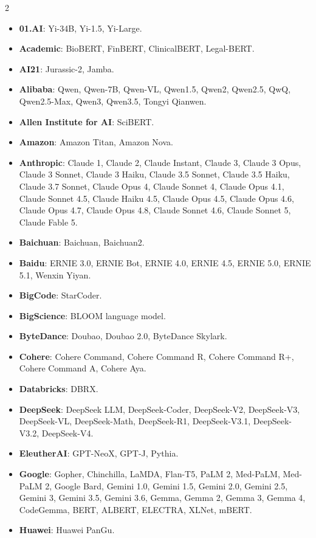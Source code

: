 \documentclass[11pt]{article}
\begin{document}
\begin{multicols}{2}
\begin{itemize} \small \setlength\itemsep{-0.4em}
  \item \textbf{01.AI}: Yi-34B, Yi-1.5, Yi-Large.
  \item \textbf{Academic}: BioBERT, FinBERT, ClinicalBERT, Legal-BERT.
  \item \textbf{AI21}: Jurassic-2, Jamba.
  \item \textbf{Alibaba}: Qwen, Qwen-7B, Qwen-VL, Qwen1.5, Qwen2, Qwen2.5, QwQ, Qwen2.5-Max, Qwen3, Qwen3.5, Tongyi Qianwen.
  \item \textbf{Allen Institute for AI}: SciBERT.
  \item \textbf{Amazon}: Amazon Titan, Amazon Nova.
  \item \textbf{Anthropic}: Claude 1, Claude 2, Claude Instant, Claude 3, Claude 3 Opus, Claude 3 Sonnet, Claude 3 Haiku, Claude 3.5 Sonnet, Claude 3.5 Haiku, Claude 3.7 Sonnet, Claude Opus 4, Claude Sonnet 4, Claude Opus 4.1, Claude Sonnet 4.5, Claude Haiku 4.5, Claude Opus 4.5, Claude Opus 4.6, Claude Opus 4.7, Claude Opus 4.8, Claude Sonnet 4.6, Claude Sonnet 5, Claude Fable 5.
  \item \textbf{Baichuan}: Baichuan, Baichuan2.
  \item \textbf{Baidu}: ERNIE 3.0, ERNIE Bot, ERNIE 4.0, ERNIE 4.5, ERNIE 5.0, ERNIE 5.1, Wenxin Yiyan.
  \item \textbf{BigCode}: StarCoder.
  \item \textbf{BigScience}: BLOOM language model.
  \item \textbf{ByteDance}: Doubao, Doubao 2.0, ByteDance Skylark.
  \item \textbf{Cohere}: Cohere Command, Cohere Command R, Cohere Command R+, Cohere Command A, Cohere Aya.
  \item \textbf{Databricks}: DBRX.
  \item \textbf{DeepSeek}: DeepSeek LLM, DeepSeek-Coder, DeepSeek-V2, DeepSeek-V3, DeepSeek-VL, DeepSeek-Math, DeepSeek-R1, DeepSeek-V3.1, DeepSeek-V3.2, DeepSeek-V4.
  \item \textbf{EleutherAI}: GPT-NeoX, GPT-J, Pythia.
  \item \textbf{Google}: Gopher, Chinchilla, LaMDA, Flan-T5, PaLM 2, Med-PaLM, Med-PaLM 2, Google Bard, Gemini 1.0, Gemini 1.5, Gemini 2.0, Gemini 2.5, Gemini 3, Gemini 3.5, Gemini 3.6, Gemma, Gemma 2, Gemma 3, Gemma 4, CodeGemma, BERT, ALBERT, ELECTRA, XLNet, mBERT.
  \item \textbf{Huawei}: Huawei PanGu.

\end{itemize}
\end{multicols}
\end{document}
